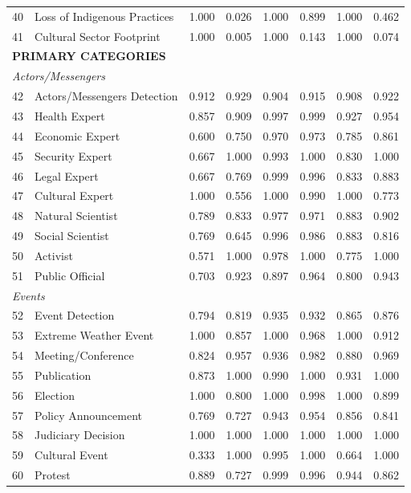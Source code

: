 {\begin{longtable}{p{0.4cm}p{5.5cm}rrrrrr}
40 & Loss of Indigenous Practices & 1.000 & 0.026 & 1.000 & 0.899 & 1.000 & 0.462 \\
41 & Cultural Sector Footprint & 1.000 & 0.005 & 1.000 & 0.143 & 1.000 & 0.074 \\
\multicolumn{8}{l}{\cellcolor{gray!10}\textbf{PRIMARY CATEGORIES}} \\
\midrule
\multicolumn{8}{l}{\textit{Actors/Messengers}} \\
42 & Actors/Messengers Detection & 0.912 & 0.929 & 0.904 & 0.915 & 0.908 & 0.922 \\
43 & Health Expert & 0.857 & 0.909 & 0.997 & 0.999 & 0.927 & 0.954 \\
44 & Economic Expert & 0.600 & 0.750 & 0.970 & 0.973 & 0.785 & 0.861 \\
45 & Security Expert & 0.667 & 1.000 & 0.993 & 1.000 & 0.830 & 1.000 \\
46 & Legal Expert & 0.667 & 0.769 & 0.999 & 0.996 & 0.833 & 0.883 \\
47 & Cultural Expert & 1.000 & 0.556 & 1.000 & 0.990 & 1.000 & 0.773 \\
48 & Natural Scientist & 0.789 & 0.833 & 0.977 & 0.971 & 0.883 & 0.902 \\
49 & Social Scientist & 0.769 & 0.645 & 0.996 & 0.986 & 0.883 & 0.816 \\
50 & Activist & 0.571 & 1.000 & 0.978 & 1.000 & 0.775 & 1.000 \\
51 & Public Official & 0.703 & 0.923 & 0.897 & 0.964 & 0.800 & 0.943 \\
\multicolumn{8}{l}{\textit{Events}} \\
52 & Event Detection & 0.794 & 0.819 & 0.935 & 0.932 & 0.865 & 0.876 \\
53 & Extreme Weather Event & 1.000 & 0.857 & 1.000 & 0.968 & 1.000 & 0.912 \\
54 & Meeting/Conference & 0.824 & 0.957 & 0.936 & 0.982 & 0.880 & 0.969 \\
55 & Publication & 0.873 & 1.000 & 0.990 & 1.000 & 0.931 & 1.000 \\
56 & Election & 1.000 & 0.800 & 1.000 & 0.998 & 1.000 & 0.899 \\
57 & Policy Announcement & 0.769 & 0.727 & 0.943 & 0.954 & 0.856 & 0.841 \\
58 & Judiciary Decision & 1.000 & 1.000 & 1.000 & 1.000 & 1.000 & 1.000 \\
59 & Cultural Event & 0.333 & 1.000 & 0.995 & 1.000 & 0.664 & 1.000 \\
60 & Protest & 0.889 & 0.727 & 0.999 & 0.996 & 0.944 & 0.862 \\

\end{longtable}}
